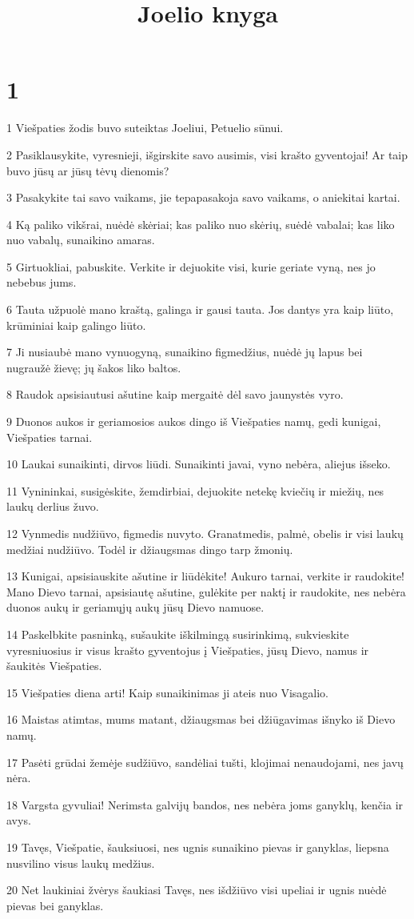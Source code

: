 

\title{Joelio knyga}

\chapter{1}


\par 1 Viešpaties žodis buvo suteiktas Joeliui, Petuelio sūnui. 
\par 2 Pasiklausykite, vyresnieji, išgirskite savo ausimis, visi krašto gyventojai! Ar taip buvo jūsų ar jūsų tėvų dienomis? 
\par 3 Pasakykite tai savo vaikams, jie tepapasakoja savo vaikams, o anie­kitai kartai. 
\par 4 Ką paliko vikšrai, nuėdė skėriai; kas paliko nuo skėrių, suėdė vabalai; kas liko nuo vabalų, sunaikino amaras. 
\par 5 Girtuokliai, pabuskite. Verkite ir dejuokite visi, kurie geriate vyną, nes jo nebebus jums. 
\par 6 Tauta užpuolė mano kraštą, galinga ir gausi tauta. Jos dantys yra kaip liūto, krūminiai kaip galingo liūto. 
\par 7 Ji nusiaubė mano vynuogyną, sunaikino figmedžius, nuėdė jų lapus bei nugraužė žievę; jų šakos liko baltos. 
\par 8 Raudok apsisiautusi ašutine kaip mergaitė dėl savo jaunystės vyro. 
\par 9 Duonos aukos ir geriamosios aukos dingo iš Viešpaties namų, gedi kunigai, Viešpaties tarnai. 
\par 10 Laukai sunaikinti, dirvos liūdi. Sunaikinti javai, vyno nebėra, aliejus išseko. 
\par 11 Vynininkai, susigėskite, žemdirbiai, dejuokite netekę kviečių ir miežių, nes laukų derlius žuvo. 
\par 12 Vynmedis nudžiūvo, figmedis nuvyto. Granatmedis, palmė, obelis ir visi laukų medžiai nudžiūvo. Todėl ir džiaugsmas dingo tarp žmonių. 
\par 13 Kunigai, apsisiauskite ašutine ir liūdėkite! Aukuro tarnai, verkite ir raudokite! Mano Dievo tarnai, apsisiautę ašutine, gulėkite per naktį ir raudokite, nes nebėra duonos aukų ir geriamųjų aukų jūsų Dievo namuose. 
\par 14 Paskelbkite pasninką, sušaukite iškilmingą susirinkimą, sukvieskite vyresniuosius ir visus krašto gyventojus į Viešpaties, jūsų Dievo, namus ir šaukitės Viešpaties. 
\par 15 Viešpaties diena arti! Kaip sunaikinimas ji ateis nuo Visagalio. 
\par 16 Maistas atimtas, mums matant, džiaugsmas bei džiūgavimas išnyko iš Dievo namų. 
\par 17 Pasėti grūdai žemėje sudžiūvo, sandėliai tušti, klojimai nenaudojami, nes javų nėra. 
\par 18 Vargsta gyvuliai! Nerimsta galvijų bandos, nes nebėra joms ganyklų, kenčia ir avys. 
\par 19 Tavęs, Viešpatie, šauksiuosi, nes ugnis sunaikino pievas ir ganyklas, liepsna nusvilino visus laukų medžius. 
\par 20 Net laukiniai žvėrys šaukiasi Tavęs, nes išdžiūvo visi upeliai ir ugnis nuėdė pievas bei ganyklas.


